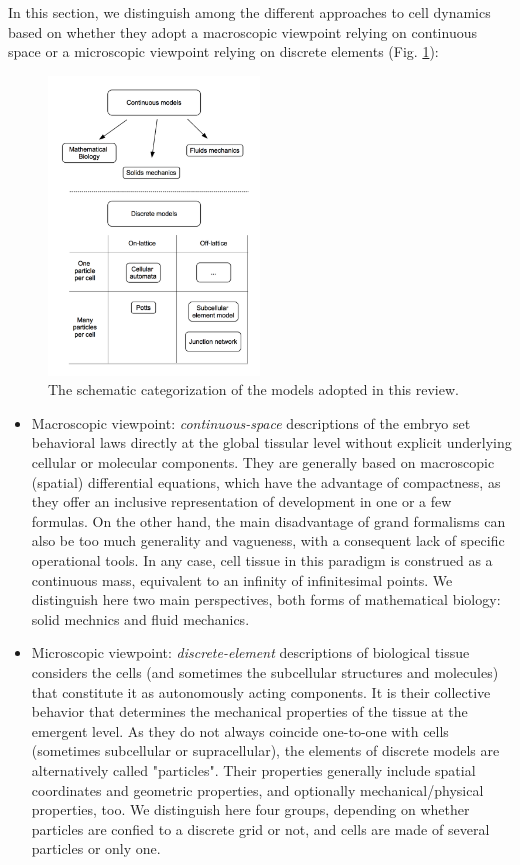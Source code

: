 In this section, we distinguish among the different approaches to cell dynamics based on whether they adopt a macroscopic viewpoint relying on continuous space or a microscopic viewpoint relying on discrete elements (Fig. \ref{biomechanics_sota_general_type_of_models}): 
\begin{figure}
\begin{center}
\includegraphics[width=0.5\textwidth]{../../images/biomechanics_sota/general_type_of_models.png}
\end{center}
\caption{The schematic categorization of the models adopted in this review.}
\label{biomechanics_sota_general_type_of_models}
\end{figure}
\begin{itemize}
	\item Macroscopic viewpoint: \textit{continuous-space} descriptions of the embryo set behavioral laws directly at the global tissular level without explicit underlying cellular or molecular components. They are generally based on macroscopic (spatial) differential equations, which have the advantage of compactness, as they offer an inclusive representation of development in one or a few formulas. On the other hand, the main disadvantage of grand formalisms can also be too much generality and vagueness, with a consequent lack of specific operational tools. In any case, cell tissue in this paradigm is construed as a continuous mass, equivalent to an infinity of infinitesimal points. We distinguish here two main perspectives, both forms of mathematical biology: solid mechnics and fluid mechanics.
	\item Microscopic viewpoint: \textit{discrete-element} descriptions of biological tissue considers the cells (and sometimes the subcellular structures and molecules) that constitute it as autonomously acting components. It is their collective behavior that determines the mechanical properties of the tissue at the emergent level. As they do not always coincide one-to-one with cells (sometimes subcellular or supracellular), the elements of discrete models are alternatively called "particles". Their properties generally include spatial coordinates and geometric properties, and optionally mechanical/physical properties, too. We distinguish here four groups, depending on whether particles are confied to a discrete grid or not, and cells are made of several particles or only one.
\end{itemize}
